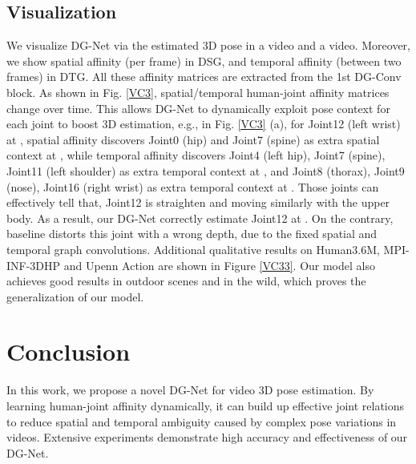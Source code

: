 \documentclass[journal]{IEEEtran}
\begin{document}
\subsection{Visualization}
We visualize DG-Net via the estimated 3D pose in a  video and a  video.
Moreover,
we show spatial affinity (per frame) in DSG,
and temporal affinity (between two frames) in DTG.
All these affinity matrices are extracted from the 1st DG-Conv block.
As shown in Fig. \ref{VC3},
spatial/temporal human-joint affinity matrices change over time.
This allows DG-Net to dynamically exploit pose context for each joint to boost 3D estimation,
e.g.,
in  Fig. \ref{VC3} (a),  for Joint12 (left wrist) at ,
spatial affinity discovers Joint0 (hip) and Joint7 (spine) as extra spatial context at ,
while
temporal affinity discovers Joint4 (left hip), Joint7 (spine), Joint11 (left shoulder) as extra temporal context at ,
and Joint8 (thorax), Joint9 (nose), Joint16 (right wrist) as extra temporal context at .
Those joints can effectively tell that,
Joint12 is straighten and moving similarly with the upper body.
As a result,
our DG-Net correctly estimate Joint12 at .
On the contrary,
baseline distorts this joint with a wrong depth,
due to the fixed spatial and temporal graph convolutions.
Additional qualitative results on Human3.6M\cite{h36m_pami}, MPI-INF-3DHP \cite{mono_3dhp2017}  and Upenn Action \cite{zhang2013actemes} are shown in Figure \ref{VC33}. Our model also achieves good results in outdoor scenes and in the wild, which proves the generalization of our model.


\section{Conclusion}
In this work,
we propose a novel DG-Net for video 3D pose estimation.
By learning human-joint affinity dynamically,
it can build up effective joint relations to reduce spatial and temporal ambiguity caused by complex pose variations in videos.
Extensive experiments demonstrate high accuracy and effectiveness of our DG-Net.





\ifCLASSOPTIONcaptionsoff
  \newpage
\fi
\end{document}
